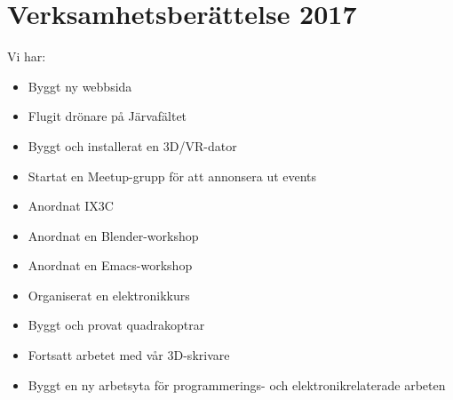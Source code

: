 \documentclass[a4paper,11pt,oneside]{article}
\begin{document}
\section{Verksamhetsberättelse 2017}

Vi har: \\
\begin{itemize}
\item Byggt ny webbsida
\item Flugit drönare på Järvafältet
\item Byggt och installerat en 3D/VR-dator
\item Startat en Meetup-grupp för att annonsera ut events
\item Anordnat IX3C
\item Anordnat en Blender-workshop
\item Anordnat en Emacs-workshop
\item Organiserat en elektronikkurs
\item Byggt och provat quadrakoptrar
\item Fortsatt arbetet med vår 3D-skrivare
\item Byggt en ny arbetsyta för programmerings- och elektronikrelaterade arbeten
\end{itemize}
\end{document}
